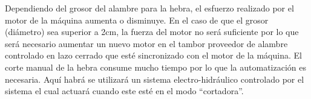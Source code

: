 \documentclass[main_conf.tex]{subfiles}
\begin{document}
Dependiendo del grosor del alambre para la hebra, el esfuerzo realizado por
el motor de la máquina aumenta o disminuye. En el caso de que el grosor
(diámetro) sea superior a 2cm, la fuerza del motor no será suficiente por
lo que será necesario aumentar un nuevo motor en el tambor proveedor de
alambre controlado en lazo cerrado que esté sincronizado con el motor de
la máquina.
El corte manual de la hebra consume mucho tiempo por lo que la 
automatización es  necesaria. Aquí habrá se utilizará un sistema 
electro-hidráulico controlado por el sistema el cual actuará cuando este 
esté en el modo “cortadora”.



%
%
%




\end{document}
